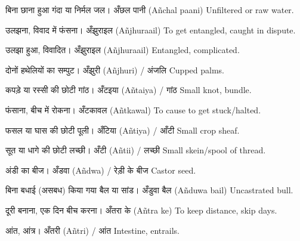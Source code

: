 %
{बिना छाना हुआ गंदा या निर्मल जल।}%
{अँछल पानी (Añchal paani)}%
{Unfiltered or raw water.}

%
{उलझना, विवाद में फंसना।}%
{अँझुराइल (Añjhuraail)}%
{To get entangled, caught in dispute.}

%
{उलझा हुआ, विवादित।}%
{अँझुराइल (Añjhuraail)}%
{Entangled, complicated.}

%
{दोनों हथेलियों का सम्पुट।}%
{अँझुरी (Añjhuri) / अंजलि}%
{Cupped palms.}

%
{कपड़े या रस्सी की छोटी गांठ।}%
{अँटइया (Añtaiya) / गांठ}%
{Small knot, bundle.}

%
{फंसाना, बीच में रोकना।}%
{अँटकावल (Añtkawal)}%
{To cause to get stuck/halted.}

%
{फसल या घास की छोटी पूली।}%
{अँटिया (Añtiya) / आँटी}%
{Small crop sheaf.}

%
{सूत या धागे की छोटी लच्छी।}%
{अँटी (Añtii) / लच्छी}%
{Small skein/spool of thread.}

%
{अंडी का बीज।}%
{अँडवा (Añdwa) / रेड़ी के बीज}%
{Castor seed.}

%
{बिना बधाई (असबध) किया गया बैल या सांड।}%
{अँडुवा बैल (Añduwa bail)}%
{Uncastrated bull.}

%
{दूरी बनाना, एक दिन बीच करना।}%
{अँतरा के (Añtra ke)}%
{To keep distance, skip days.}

%
{आंत, आंत्र।}%
{अँतरी (Añtri) / आंत}%
{Intestine, entrails.}

